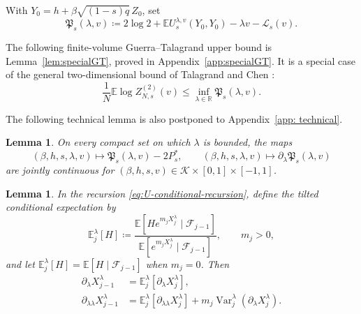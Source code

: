 \documentclass[11pt]{article}
\newtheorem{lemma}[theorem]{Lemma}
\numberwithin{equation}{section}
\newcommand{\E}{\mathbb{E}}
\newcommand{\1}{\mathbf 1}
\newcommand{\cK}{\mathcal K}
\begin{document}
With $Y_0=h+\beta\sqrt{(1-s)q}\,Z_0$, set
\begin{equation}
 \mathfrak P_s(\lambda,v)
 \coloneqq2\log2+\E U_s^{\lambda,v}(Y_0,Y_0)
 -\lambda v-\mathcal L_s(v).
 \label{eq:GTfunctional}
\end{equation}

The following finite-volume Guerra--Talagrand upper bound is
Lemma~\ref{lem:specialGT}, proved in Appendix~\ref{app:specialGT}. It is a special case
of the general two-dimensional bound of Talagrand and Chen
\cite{Talagrand,ChenGT}:
\begin{equation}
 \frac1N\E\log Z^{(2)}_{N,s}(v)
 \le \inf_{\lambda\in \mathbb R} \mathfrak P_s(\lambda,v).
 \label{eq:GTfunctionalbound}
\end{equation}

The following technical lemma is also postponed to Appendix~\ref{app: technical}.

\begin{lemma}
\label{lem:GTcontinuity}
On every compact set on which $\lambda$ is bounded, the maps
\[
 (\beta,h,s,\lambda,v)\longmapsto
 \mathfrak P_s(\lambda,v)-2P_s^*,
 \qquad
 (\beta,h,s,\lambda,v)\longmapsto
 \partial_\lambda\mathfrak P_s(\lambda,v)
\]
are jointly continuous for
$(\beta,h,s,v)\in\cK\times[0,1]\times[-1,1]$.
\end{lemma}

\begin{lemma}
\label{lem:U-finite-step-derivatives}
In the recursion \eqref{eq:U-conditional-recursion}, define the tilted
conditional expectation by
\[
\E_j^\lambda[H]
\coloneqq
\frac{
\E\left[
H e^{m_jX_j^\lambda}\mid\mathcal F_{j-1}
\right]
}{
\E\left[
e^{m_jX_j^\lambda}\mid\mathcal F_{j-1}
\right]
},
\qquad m_j>0,
\]
and let $\E_j^\lambda[H]=\E[H\mid\mathcal F_{j-1}]$ when $m_j=0$.
Then
\begin{align}
\partial_\lambda X_{j-1}^\lambda
&=
\E_j^\lambda
\left[
\partial_\lambda X_j^\lambda
\right],
\label{eq:U-first-derivative-recursion}\\
\partial_{\lambda\lambda}X_{j-1}^\lambda
&=
\E_j^\lambda
\left[
\partial_{\lambda\lambda}X_j^\lambda
\right]
+
m_j
\operatorname{Var}_j^\lambda
\left(
\partial_\lambda X_j^\lambda
\right).
\label{eq:U-second-derivative-recursion}
\end{align}
\end{lemma}
\end{document}
